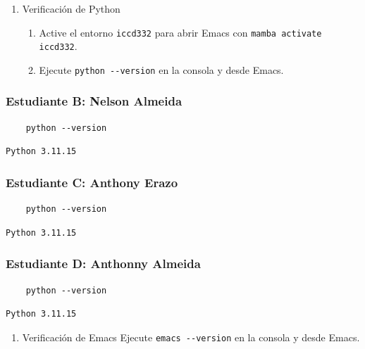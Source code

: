 \documentclass{article}
\begin{document}
\begin{enumerate}
\item Verificación de Python
\begin{enumerate}
\item Active el entorno \texttt{iccd332} para abrir Emacs con \texttt{mamba activate iccd332}.
\item Ejecute \texttt{python -{}-{}version} en la consola y desde Emacs.
\end{enumerate}
\end{enumerate}

\subsubsection{Estudiante B: Nelson Almeida}
\label{sec:org808d8a6}

\begin{verbatim}
    python --version
\end{verbatim}

\begin{verbatim}
Python 3.11.15
\end{verbatim}
\subsubsection{Estudiante C: Anthony Erazo}
\label{sec:org07170ef}
\begin{verbatim}
    python --version
\end{verbatim}

\begin{verbatim}
Python 3.11.15
\end{verbatim}

\subsubsection{Estudiante D: Anthonny Almeida}
\label{sec:orgd651703}

\begin{verbatim}
    python --version
\end{verbatim}

\begin{verbatim}
Python 3.11.15
\end{verbatim}


\begin{enumerate}
\item Verificación de Emacs
Ejecute \texttt{emacs -{}-{}version} en la consola y desde Emacs.
\end{enumerate}
\end{document}
